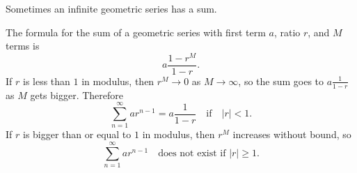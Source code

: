 \begin{frame}
Sometimes an infinite geometric series has a sum.  

The formula for the sum of a geometric series with first term $a$, ratio $r$, and $M$ terms is
\[
a\frac{1-r^M}{1-r}.
\]
If $r$ is less than $1$ in modulus, then $r^M\to 0$ as $M\to\infty$, so the sum goes to $a\frac{1}{1-r}$ as $M$ gets bigger.  Therefore
\[
\sum_{n=1}^\infty  ar^{n-1} = a\frac{1}{1-r} \quad \text{if}\quad |r|<1.
\]
If $r$ is bigger than or equal to $1$ in modulus, then $r^M$ increases without bound, so
\[
\sum_{n=1}^\infty  ar^{n-1}  \quad \text{does not exist if } |r|\geq 1.
\]
\end{frame}
